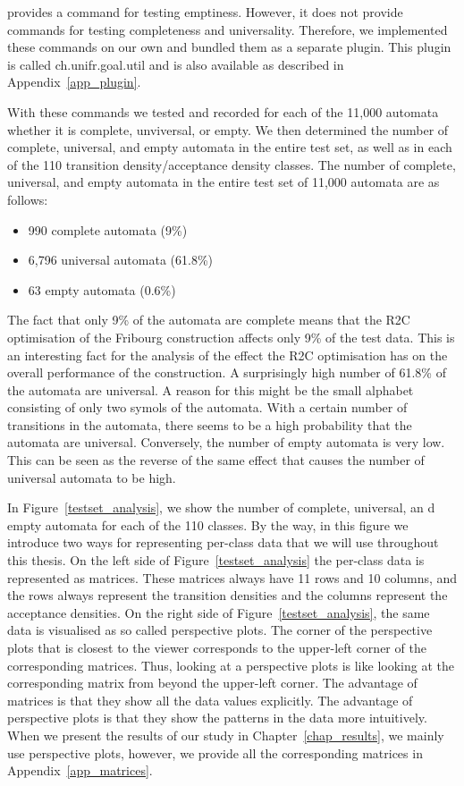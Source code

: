 \goal{} provides a command for testing emptiness. However, it does not provide commands for testing completeness and universality. Therefore, we implemented these commands on our own and bundled them as a separate \goal{} plugin. This plugin is called \textsf{ch.unifr.goal.util} and is also available as described in Appendix~\ref{app_plugin}.

With these \goal{} commands we tested and recorded for each of the 11,000 automata whether it is complete, unviversal, or empty. We then determined the number of complete, universal, and empty automata in the entire test set, as well as in each of the 110 transition density/acceptance density classes. The number of complete, universal, and empty automata in the entire test set of 11,000 automata are as follows:

\begin{itemize}
\item 990 complete automata (9\%)
\item 6,796 universal automata (61.8\%)
\item 63 empty automata (0.6\%)
\end{itemize}

The fact that only 9\% of the automata are complete means that the R2C optimisation of the Fribourg construction affects only 9\% of the test data. This is an interesting fact for the analysis of the effect the R2C optimisation has on the overall performance of the construction. A surprisingly high number of 61.8\% of the automata are universal. A reason for this might be the small alphabet consisting of only two symols of the automata. With a certain number of transitions in the automata, there seems to be a high probability that the automata are universal. Conversely, the number of empty automata is very low. This can be seen as the reverse of the same effect that causes the number of universal automata to be high.

In Figure~\ref{testset_analysis}, we show the number of complete, universal, an d empty automata for each of the 110 classes. By the way, in this figure we introduce two ways for representing per-class data that we will use throughout this thesis. On the left side of Figure~\ref{testset_analysis} the per-class data is represented as matrices. These matrices always have 11 rows and 10 columns, and the rows always represent the transition densities and the columns represent the acceptance densities. On the right side of Figure~\ref{testset_analysis}, the same data is visualised as so called perspective plots. The corner of the perspective plots that is closest to the viewer corresponds to the upper-left corner of the corresponding matrices. Thus, looking at a perspective plots is like looking at the corresponding matrix from beyond the upper-left corner. The advantage of matrices is that they show all the data values explicitly. The advantage of perspective plots is that they show the patterns in the data more intuitively. When we present the results of our study in Chapter~\ref{chap_results}, we mainly use perspective plots, however, we provide all the corresponding matrices in Appendix~\ref{app_matrices}.

